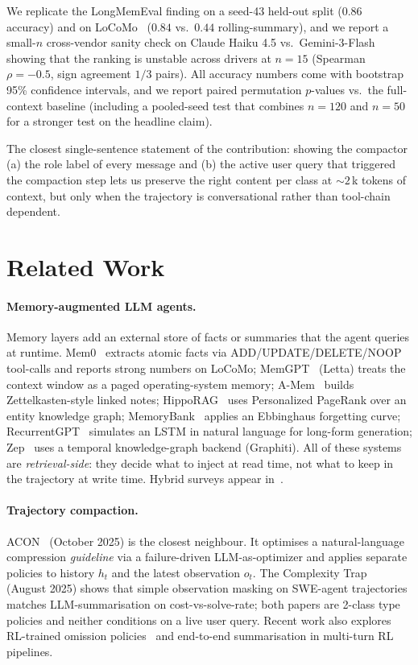 \documentclass{article}
\begin{document}
We replicate the LongMemEval finding on a seed-43 held-out split
($0.86$ accuracy) and on LoCoMo~\citep{locomo_2024} ($0.84$ vs.\
$0.44$ rolling-summary), and we report a small-$n$ cross-vendor
sanity check on Claude Haiku 4.5 vs.\ Gemini-3-Flash showing that
the ranking is unstable across drivers at $n{=}15$ (Spearman
$\rho{=}{-}0.5$, sign agreement $1/3$ pairs). All accuracy numbers
come with bootstrap 95\% confidence intervals, and we report paired
permutation $p$-values vs.\ the full-context baseline (including a
pooled-seed test that combines $n{=}120$ and $n{=}50$ for a stronger
test on the headline claim).

The closest single-sentence statement of the contribution: showing the
compactor (a) the role label of every message and (b) the active user
query that triggered the compaction step lets us preserve the right
content per class at $\sim\!2$\,k tokens of context, but only when the
trajectory is conversational rather than tool-chain dependent.

\section{Related Work}\label{sec:related}

\paragraph{Memory-augmented LLM agents.}
Memory layers add an external store of facts or summaries that the agent
queries at runtime. Mem0~\citep{mem0_2025} extracts atomic facts via
ADD/UPDATE/DELETE/NOOP tool-calls and reports strong numbers on LoCoMo;
MemGPT~\citep{memgpt_2023} (Letta) treats the context window as a paged
operating-system memory; A-Mem~\citep{amem_2025} builds Zettelkasten-style
linked notes; HippoRAG~\citep{hipporag_2024} uses Personalized
PageRank over an entity knowledge graph; MemoryBank~\citep{memorybank_2023}
applies an Ebbinghaus forgetting curve;
RecurrentGPT~\citep{recurrentgpt_2023} simulates an LSTM in natural
language for long-form generation; Zep~\citep{zep_2025} uses a
temporal knowledge-graph backend (Graphiti). All of these systems are
\emph{retrieval-side}: they decide what to inject at read time, not
what to keep in the trajectory at write time. Hybrid surveys
appear in~\citep{memory_survey_2025,rag_to_memory_2025}.

\paragraph{Trajectory compaction.}
ACON~\citep{acon_2025} (October 2025) is the closest neighbour. It
optimises a natural-language compression \emph{guideline} via a
failure-driven LLM-as-optimizer and applies separate policies to history
$h_t$ and the latest observation $o_t$. The Complexity
Trap~\citep{complexity_trap_2025} (August 2025) shows that simple
observation masking on SWE-agent trajectories matches LLM-summarisation
on cost-vs-solve-rate; both papers are 2-class type policies and neither
conditions on a live user query. Recent work also explores RL-trained
omission policies~\citep{agent_omit_2026} and end-to-end summarisation
in multi-turn RL pipelines.
\end{document}
